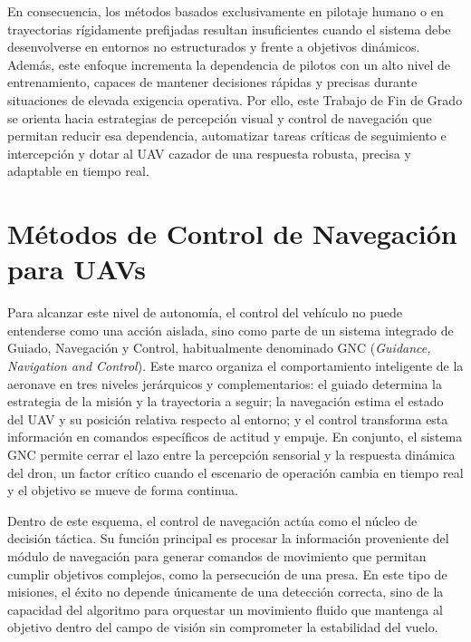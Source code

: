 En consecuencia, los métodos basados exclusivamente en pilotaje humano o en trayectorias rígidamente prefijadas resultan insuficientes cuando el sistema debe desenvolverse en entornos no estructurados y frente a objetivos dinámicos. Además, este enfoque incrementa la dependencia de pilotos con un alto nivel de entrenamiento, capaces de mantener decisiones rápidas y precisas durante situaciones de elevada exigencia operativa. Por ello, este Trabajo de Fin de Grado se orienta hacia estrategias de percepción visual y control de navegación que permitan reducir esa dependencia, automatizar tareas críticas de seguimiento e intercepción y dotar al UAV cazador de una respuesta robusta, precisa y adaptable en tiempo real.

\vspace{0.4cm}


\section{ Métodos de Control de Navegación para UAVs}

Para alcanzar este nivel de autonomía, el control del vehículo no puede entenderse como una acción aislada, sino como parte de un sistema integrado de Guiado, Navegación y Control, habitualmente denominado GNC (\textit{Guidance, Navigation and Control}). Este marco organiza el comportamiento inteligente de la aeronave en tres niveles jerárquicos y complementarios: el guiado determina la estrategia de la misión y la trayectoria a seguir; la navegación estima el estado del UAV y su posición relativa respecto al entorno; y el control transforma esta información en comandos específicos de actitud y empuje. En conjunto, el sistema GNC permite cerrar el lazo entre la percepción sensorial y la respuesta dinámica del dron, un factor crítico cuando el escenario de operación cambia en tiempo real y el objetivo se mueve de forma continua.

\vspace{0.3cm}

Dentro de este esquema, el control de navegación actúa como el núcleo de decisión táctica. Su función principal es procesar la información proveniente del módulo de navegación para generar comandos de movimiento que permitan cumplir objetivos complejos, como la persecución de una presa. En este tipo de misiones, el éxito no depende únicamente de una detección correcta, sino de la capacidad del algoritmo para orquestar un movimiento fluido que mantenga al objetivo dentro del campo de visión sin comprometer la estabilidad del vuelo.

